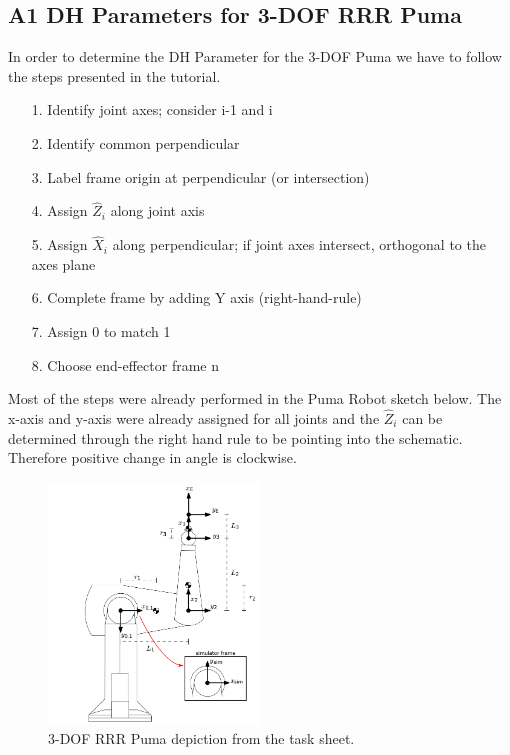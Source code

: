 


\subsection{A1 DH Parameters for 3-DOF RRR Puma}

In order to determine the DH Parameter for the 3-DOF Puma we have to follow the steps presented in the tutorial. 

\begin{itemize}
    \item [1.] Identify joint axes; consider i-1 and i
    \item [2.] Identify common perpendicular
    \item [3.] Label frame origin at perpendicular (or intersection)
    \item [4.] Assign $\hat{Z}_i$ along joint axis
    \item [5.] Assign $\hat{X}_i$ along perpendicular;
    if joint axes intersect, orthogonal to the axes plane
    \item [6.] Complete frame by adding Y axis (right-hand-rule)
    \item [7.] Assign {0} to match {1}
    \item [8.] Choose end-effector frame {n}
\end{itemize}
Most of the steps were already performed in the Puma Robot sketch below. The x-axis and y-axis were already assigned for all joints and the $\hat{Z}_i$ can be determined through the right hand rule to be pointing into the schematic. Therefore positive change in angle is clockwise. 

\begin{figure} [H]
   \begin{center}
        \includegraphics[width=0.5\textwidth]{SRC/PumaRoboter.PNG}
   \end{center}
  \caption{3-DOF RRR Puma depiction from the task sheet.}
  \label{fig:TaskPuma}
\end{figure}

